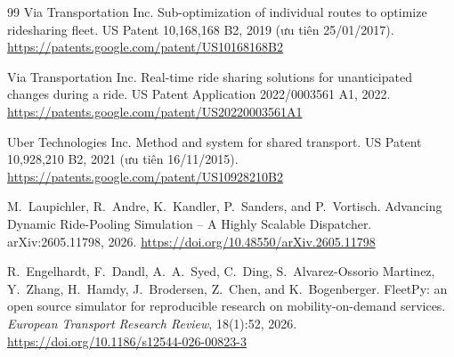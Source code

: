 \begin{thebibliography}{99}
Via Transportation Inc.
\newblock Sub-optimization of individual routes to optimize ridesharing fleet.
\newblock US Patent 10,168,168 B2, 2019 (ưu tiên 25/01/2017).
\newblock \url{https://patents.google.com/patent/US10168168B2}

Via Transportation Inc.
\newblock Real-time ride sharing solutions for unanticipated changes during a ride.
\newblock US Patent Application 2022/0003561 A1, 2022.
\newblock \url{https://patents.google.com/patent/US20220003561A1}

Uber Technologies Inc.
\newblock Method and system for shared transport.
\newblock US Patent 10,928,210 B2, 2021 (ưu tiên 16/11/2015).
\newblock \url{https://patents.google.com/patent/US10928210B2}

M.~Laupichler, R.~Andre, K.~Kandler, P.~Sanders, and P.~Vortisch.
\newblock Advancing Dynamic Ride-Pooling Simulation -- A Highly Scalable Dispatcher.
\newblock arXiv:2605.11798, 2026.
\newblock \url{https://doi.org/10.48550/arXiv.2605.11798}

R.~Engelhardt, F.~Dandl, A.~A.~Syed, C.~Ding, S.~Alvarez-Ossorio Martinez, Y.~Zhang, H.~Hamdy,
J.~Brodersen, Z.~Chen, and K.~Bogenberger.
\newblock FleetPy: an open source simulator for reproducible research on mobility-on-demand services.
\newblock \emph{European Transport Research Review}, 18(1):52, 2026.
\newblock \url{https://doi.org/10.1186/s12544-026-00823-3}


\end{thebibliography}
